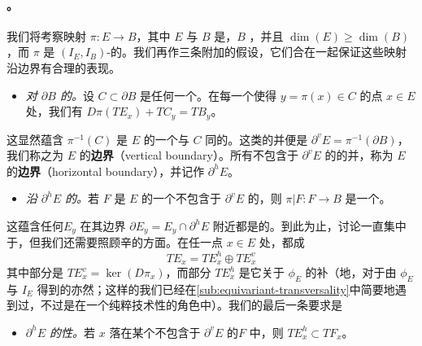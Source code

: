 \paragraph{\trFibrationWithSingularities{}。}\label{sub:fibrations-with-singularities}
我们将考察映射 $\pi\colon E\to B$，其中 $E$ 与 $B$ 是\trExactSymplectic\trCorneredBoundary\trManifold，$B$ \trConnected，并且 $\dim(E)\ge\dim(B)$，而 $\pi$ 是 $(I_E,I_B)$-\trHolomorphic{}的。我们再作三条附加的假设，它们合在一起保证这些映射沿边界有合理的表现。
\begin{itemize}
\item \emph{对 $\partial B$ 的\trTransversality。}设 $C\subset\partial B$ 是任何一个\trBoundaryStratum。在每一个使得 $y=\pi(x)\in C$ 的点 $x\in E$ 处，我们有 $D\pi(TE_x)+TC_y=TB_y$。
\end{itemize}

这显然蕴含 $\pi^{-1}(C)$ 是 $E$ 的一个与 $C$ 同\trCodimension{}的\trBoundaryStratum。这类\trStratum{}的并便是 $\partial^v E=\pi^{-1}(\partial B)$，我们称之为 $E$ 的\textbf{\trVertical{}边界}（vertical boundary）。所有不包含于 $\partial^v E$ 的\trBoundaryFace{}的并，称为 $E$ 的\textbf{\trHorizontal{}边界}（horizontal boundary），并记作 $\partial^h E$。
\begin{itemize}
\item \emph{沿 $\partial^h E$ 的\trRegularity。}若 $F$ 是 $E$ 的一个不包含于 $\partial^v E$ 的\trBoundaryFace，则 $\pi|F\colon F\to B$ 是一个\trSmooth\trFibration。
\end{itemize}

这蕴含任何\trFiber{}$E_y$ 在其边界 $\partial E_y=E_y\cap\partial^h E$ 附近都是\trSmooth{}的。到此为止，讨论一直集中于\trDifferential\trTopology，但我们还需要照顾辛的方面。在任一点 $x\in E$ 处，\trTangentSpace{}都\trSplitting{}成
\begin{equation}\label{eq:tangent-splitting}
TE_x=TE^h_x\oplus TE^v_x
\end{equation}
其中\trVertical{}部分是 $TE^v_x=\ker(D\pi_x)$，而\trHorizontal{}部分 $TE^h_x$ 是它关于 $\phi_E$ 的\trOrthogonal{}补（\trEquivalence{}地，对于由 $\phi_E$ 与 $I_E$ 得到的\trMetric{}亦然；这样的\trSplitting{}我们已经在\cref{sub:equivariant-transversality}中简要地遇到过，不过是在一个纯粹技术性的角色中）。我们的最后一条要求是
\begin{itemize}
\item \emph{$\partial^h E$ 的\trHorizontal{}性。}若 $x$ 落在某个不包含于 $\partial^v E$ 的\trBoundaryFace{}$F$ 中，则 $TE^h_x\subset TF_x$。
\end{itemize}

